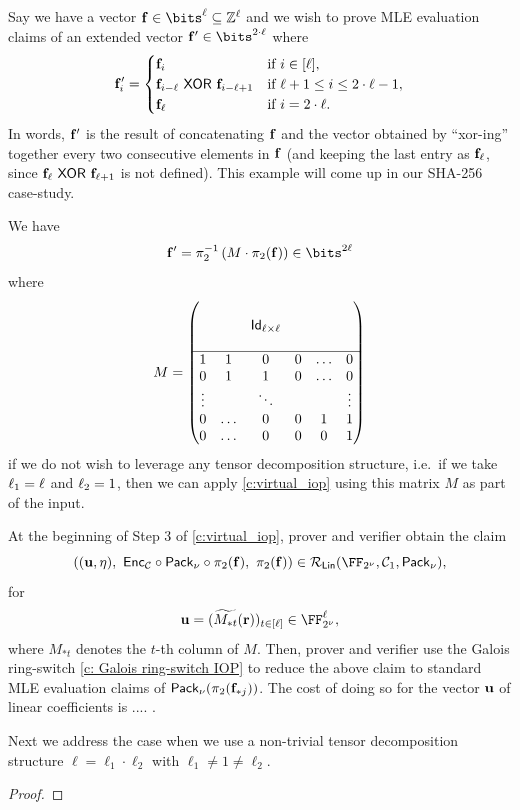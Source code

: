 \documentclass[11pt,letterpaper,usenames,dvipsnames]{article}
\begin{document}
\begin{example}\label{e:virtual_example}
    Say we have a vector $\bff\in \bits^{\codedim} \subseteq \ZZ^\codedim$ and we wish to prove MLE evaluation claims of an extended vector $\bff' \in \bits^{2\cdot \codedim}$ where 
    $$
    \mathbf{f}_i' = \begin{cases}
    \mathbf{f}_i  & \text{if } i \in [\ell],\\
    \mathbf{f}_{i -\ell } \ \mathsf{XOR}\  \mathbf{f}_{i - \ell +1} & \text{if } \ell+1 \leq i \leq 2\cdot \ell -1,\\
    \mathbf{f}_{\ell} & \text{if } i =2\cdot \ell.
    \end{cases}
    $$
    In words, $\mathbf{f}'$ is the result of concatenating $\mathbf{f}$ and the vector obtained by ``xor-ing'' together every two consecutive elements in $\mathbf{f}$ (and keeping the last entry as $\mathbf{f}_{\ell}$, since $\mathbf{f}_{\ell} \ \mathsf{XOR}\  \mathbf{f}_{\ell+1}$ is not defined). This example will come up in our SHA-256 case-study.

    
    We have
    $$
    \bff' = \pi_2^{-1}\left(M \cdot \pi_2(\bff)\right)   \in \bits^{2\codedim}
    $$
    where
    $$
M = \begin{pmatrix}
        & & & &\\
       & & \mathsf{Id}_{\ell\times \ell} & & \\
               & & & &\\
               \hline
        1 & 1 &  0 & 0 & \ldots & 0\\
        0 & 1 & 1 & 0 & \ldots & 0 \\
        \vdots & & \ddots & & & \vdots\\
        0 &  \ldots &  0 & 0 & 1 & 1 \\
        0 & \ldots & 0& 0 & 0 & 1 \\
    \end{pmatrix} 
    $$
     if we do not wish to leverage any tensor decomposition structure, i.e.\ if we take $\ell_1=\ell$ and $\ell_2=1$, then we can apply  \cref{c:virtual_iop} using this matrix $M$ as part of the input. 
     
     
     At the beginning of Step 3 of \cref{c:virtual_iop}, prover and verifier obtain the claim 
     $$
     \left((\uu, \eta),\ \Enc_{\cC}\circ \pack\circ\pi_2(\bff), \ \pi_2(\bff)\right) \in \LIN( \comfield,\cC_1,\pack),
     $$
     for  $$\uu = (\mle{M_{*t}}(\rr))_{t\in [\codedim]} \in \comfield^{\codedim},$$ where $M_{*t}$ denotes the $t$-th column of $M$. Then, prover and verifier use the Galois ring-switch \cref{c: Galois ring-switch IOP} to reduce the above claim to standard MLE evaluation claims of $\mathsf{Pack}_\nu(\pi_2(\mathbf{f}_{*j}))$. The cost of doing so for the vector $\mathbf{u}$ of linear coefficients is .... .
    
    Next we address the case when we use a non-trivial tensor decomposition structure $\ell= \ell_1 \cdot \ell_2$ with $\ell_1\neq 1 \neq \ell_2$. 
     
\end{example} 

\begin{theorem}\label{t:thm_virtual_IOPP}
\end{theorem}
\begin{proof}
\end{proof}
\end{document}
